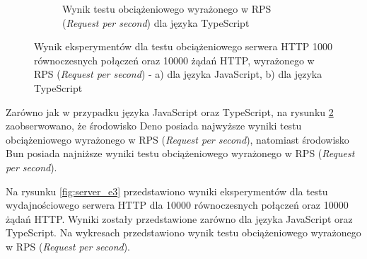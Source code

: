 \begin{figure}[H]
\begin{subfigure}[b]{0.42\textwidth}
    \caption{Wynik testu obciążeniowego wyrażonego w RPS (\textit{Request per second}) dla języka TypeScript}
    \label{fig:server_e2_ts}
  \end{subfigure}
  \caption{Wynik eksperymentów dla testu obciążeniowego serwera HTTP 1000 równoczesnych połączeń oraz 10000 żądań HTTP, wyrażonego w RPS (\textit{Request per second}) - a) dla języka JavaScript, b) dla języka TypeScript}
  \label{fig:server_e2}
\end{figure}

Zarówno jak w przypadku języka JavaScript oraz TypeScript, na rysunku \ref{fig:server_e2} zaobserwowano, że środowisko Deno posiada najwyższe wyniki testu obciążeniowego wyrażonego w RPS (\textit{Request per second}), natomiast środowisko Bun posiada najniższe wyniki testu obciążeniowego wyrażonego w RPS (\textit{Request per second}).

Na rysunku \ref{fig:server_e3} przedstawiono wyniki eksperymentów dla testu wydajnościowego serwera HTTP dla 10000 równoczesnych połączeń oraz 10000 żądań HTTP. Wyniki zostały przedstawione zarówno dla języka JavaScript oraz TypeScript. Na wykresach przedstawiono wynik testu obciążeniowego wyrażonego w RPS (\textit{Request per second}).

